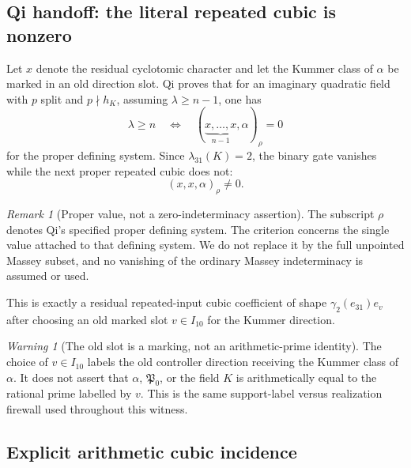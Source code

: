 \documentclass[11pt]{article}
\theoremstyle{remark}
\newtheorem{remark}[theorem]{Remark}
\newtheorem{warning}[theorem]{Warning}
\begin{document}
\subsection{Qi handoff: the literal repeated cubic is nonzero}

Let \(x\) denote the residual cyclotomic character and let the Kummer class of
\(\alpha\) be marked in an old direction slot.  Qi proves that for an
imaginary quadratic field with \(p\) split and \(p\nmid h_K\), assuming
\(\lambda\ge n-1\), one has
\[
 \lambda\ge n
 \quad\Longleftrightarrow\quad
 (\underbrace{x,\ldots,x}_{n-1},\alpha)_\rho=0
\]
for the proper defining system.  Since
\(\lambda_{31}(K)=2\), the binary gate vanishes while the next proper repeated
cubic does not:
\begin{equation}
 \boxed{
 (x,x,\alpha)_\rho\ne0.
 }
 \label{eq:v063-qi-cubic-nonzero}
\end{equation}

\begin{remark}[Proper value, not a zero-indeterminacy assertion]
\label{W31-rem:qi-proper-value-indeterminacy}
The subscript \(\rho\) denotes Qi's specified proper defining system.  The
criterion concerns the single value attached to that defining system.  We do
not replace it by the full unpointed Massey subset, and no vanishing of the
ordinary Massey indeterminacy is assumed or used.
\end{remark}
This is exactly a residual repeated-input cubic coefficient of shape
\(\gamma_2(e_{31})e_v\) after choosing an old marked slot \(v\in I_{10}\)
for the Kummer direction.

\begin{warning}[The old slot is a marking, not an arithmetic-prime identity]
\label{warn:v063-old-slot-marking}
The choice of \(v\in I_{10}\) labels the old controller direction receiving
the Kummer class of \(\alpha\).  It does not assert that \(\alpha\),
\(\mathfrak P_0\), or the field \(K\) is arithmetically equal to the rational
prime labelled by \(v\).  This is the same support-label versus realization
 firewall used throughout this witness.
\end{warning}

\subsection{Explicit arithmetic cubic incidence}
\end{document}
